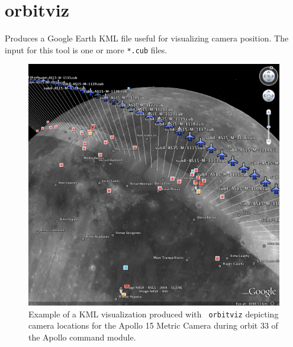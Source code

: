 \section{orbitviz}
\label{orbitviz}

Produces a Google Earth \ac{KML} file useful for visualizing camera
position. The input for this tool is one or more \texttt{*.cub} files.

\begin{figure}[!b]
  \begin{center}
  \includegraphics[width=6in]{images/orbitviz_ge_result_600px.png}
  \end{center}
  \caption{ Example of a \ac{KML} visualization produced with {\tt
      orbitviz} depicting camera locations for the Apollo 15 Metric
    Camera during orbit 33 of the Apollo command module.}
  \label{fig:orbitviz_example}
\end{figure}

